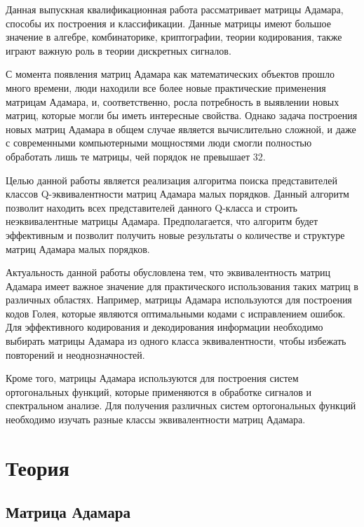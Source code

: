 \documentclass[a4paper, 14pt]{extreport}
\begin{document}
Данная выпускная квалификационная работа рассматривает матрицы Адамара, способы их построения и классификации. Данные матрицы имеют большое значение в алгебре, комбинаторике, криптографии, теории кодирования, также играют важную роль в теории дискретных сигналов. 

С момента появления матриц Адамара как математических объектов прошло много времени, люди находили все более новые практические применения матрицам Адамара, и, соответственно, росла потребность в выявлении новых матриц, которые могли бы иметь интересные свойства. Однако задача построения новых матриц Адамара в общем случае является вычислительно сложной, и даже с современными компьютерными мощностями люди смогли полностью обработать лишь те матрицы, чей порядок не превышает 32.

Целью данной работы является реализация алгоритма поиска представителей классов Q-эквивалентности матриц Адамара малых порядков. Данный алгоритм позволит находить всех представителей данного Q-класса и строить неэквивалентные матрицы Адамара. Предполагается, что алгоритм будет эффективным и позволит получить новые результаты о количестве и структуре матриц Адамара малых порядков.

Актуальность данной работы обусловлена тем, что эквивалентность матриц Адамара имеет важное значение для практического использования таких матриц в различных областях. Например, матрицы Адамара используются для построения кодов Голея, которые являются оптимальными кодами с исправлением ошибок. Для эффективного кодирования и декодирования информации необходимо выбирать матрицы Адамара из одного класса эквивалентности, чтобы избежать повторений и неоднозначностей.

Кроме того, матрицы Адамара используются для построения систем ортогональных функций, которые применяются в обработке сигналов и спектральном анализе. Для получения различных систем ортогональных функций необходимо изучать разные классы эквивалентности матриц Адамара.

\vkrMain

\nocite{horadam:hma}
\nocite{orrick:so}
\nocite{sloane:lhm}

\section{Теория}

\subsection{Матрица Адамара}
\end{document}
